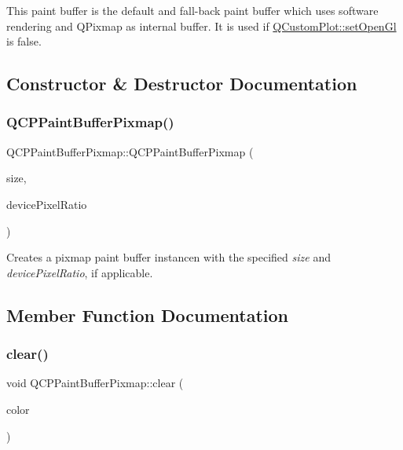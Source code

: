 This paint buffer is the default and fall-\/back paint buffer which uses software rendering and Q\+Pixmap as internal buffer. It is used if \hyperlink{classQCustomPlot_a7db1adc09016329f3aef7c60da935789}{Q\+Custom\+Plot\+::set\+Open\+Gl} is false. 

\subsection{Constructor \& Destructor Documentation}
\mbox{\label{classQCPPaintBufferPixmap_aef0224e03b9285509391fcd61a8e6844}} 
\subsubsection{\texorpdfstring{Q\+C\+P\+Paint\+Buffer\+Pixmap()}{QCPPaintBufferPixmap()}}
{\footnotesize\ttfamily Q\+C\+P\+Paint\+Buffer\+Pixmap\+::\+Q\+C\+P\+Paint\+Buffer\+Pixmap (\begin{DoxyParamCaption}\item[{const Q\+Size \&}]{size,  }\item[{double}]{device\+Pixel\+Ratio }\end{DoxyParamCaption})\hspace{0.3cm}{\ttfamily [explicit]}}

Creates a pixmap paint buffer instancen with the specified {\itshape size} and {\itshape device\+Pixel\+Ratio}, if applicable. 

\subsection{Member Function Documentation}
\mbox{\label{classQCPPaintBufferPixmap_a14badbd010a3cde6b55817ccb7b65217}} 
\subsubsection{\texorpdfstring{clear()}{clear()}}
{\footnotesize\ttfamily void Q\+C\+P\+Paint\+Buffer\+Pixmap\+::clear (\begin{DoxyParamCaption}\item[{const Q\+Color \&}]{color }\end{DoxyParamCaption})\hspace{0.3cm}{\ttfamily [virtual]}}

